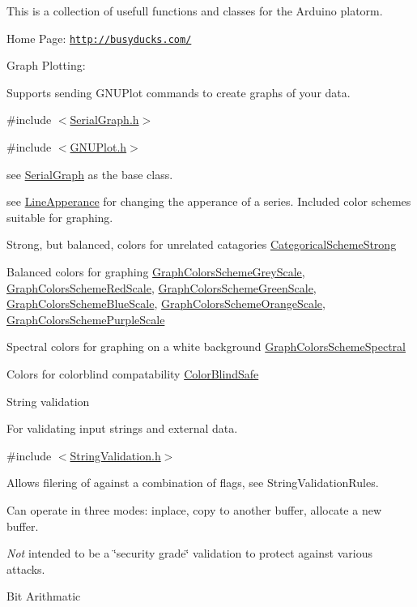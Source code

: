 This is a collection of usefull functions and classes for the Arduino platorm.

Home Page\+: \href{http://busyducks.com/}{\tt http\+://busyducks.\+com/}

Graph Plotting\+:
\begin{DoxyItemize}
\item Supports sending G\+N\+U\+Plot commands to create graphs of your data.
\item \#include $<$\hyperlink{_serial_graph_8h}{Serial\+Graph.\+h}$>$
\item \#include $<$\hyperlink{_g_n_u_plot_8h}{G\+N\+U\+Plot.\+h}$>$
\item see \hyperlink{class_serial_graph}{Serial\+Graph} as the base class.
\item see \hyperlink{struct_line_apperance}{Line\+Apperance} for changing the apperance of a series. Included color schemes suitable for graphing.
\begin{DoxyItemize}
\item Strong, but balanced, colors for unrelated catagories \hyperlink{_line_apperance_8h_a1e42ce190c01f4415b1ea96e3f113c84}{Categorical\+Scheme\+Strong}
\item Balanced colors for graphing \hyperlink{_line_apperance_8h_a6d48f70f76f6e9d41e4272b04dff1008}{Graph\+Colors\+Scheme\+Grey\+Scale}, \hyperlink{_line_apperance_8h_a277e168f3720b3d07131d9d402f28f33}{Graph\+Colors\+Scheme\+Red\+Scale}, \hyperlink{_line_apperance_8h_a0ab80737f9ec4bde245b67fd27a53d36}{Graph\+Colors\+Scheme\+Green\+Scale}, \hyperlink{_line_apperance_8h_a948426d1c597f9820a092fc49737bd7f}{Graph\+Colors\+Scheme\+Blue\+Scale}, \hyperlink{_line_apperance_8h_a73a0c1e1e60774d861f1887c24078ee9}{Graph\+Colors\+Scheme\+Orange\+Scale}, \hyperlink{_line_apperance_8h_a8462197caad1bdc2b174b46899e68793}{Graph\+Colors\+Scheme\+Purple\+Scale}
\item Spectral colors for graphing on a white background \hyperlink{_line_apperance_8h_a250826c1d27d3626eb24afa95310041f}{Graph\+Colors\+Scheme\+Spectral}
\item Colors for colorblind compatability \hyperlink{_line_apperance_8h_abc59bc8bf0930be7e1ced4a6ca602688}{Color\+Blind\+Safe}
\end{DoxyItemize}
\end{DoxyItemize}String validation
\begin{DoxyItemize}
\item For validating input strings and external data.
\item \#include $<$\hyperlink{_string_validation_8h}{String\+Validation.\+h}$>$
\item Allows filering of against a combination of flags, see String\+Validation\+Rules.
\item Can operate in three modes\+: inplace, copy to another buffer, allocate a new buffer.
\item {\itshape Not} intended to be a \char`\"{}security grade\char`\"{} validation to protect against various attacks.
\end{DoxyItemize}Bit Arithmatic
